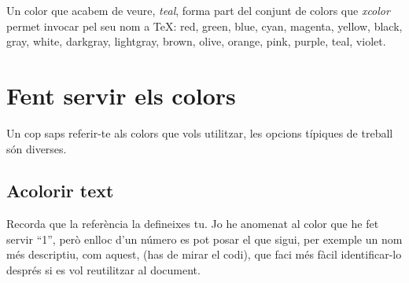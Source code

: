\documentclass[a4paper,12pt]{article}
\begin{document}
Un color que acabem de veure, \emph{teal}, forma part del conjunt de colors que \emph{xcolor} permet invocar pel seu nom a TeX:  red,  green,
 blue,
 cyan,
 magenta,
 yellow,
 black,
 gray,
 white,
 darkgray,
 lightgray,
 brown,
 olive,
 orange,
 pink,
 purple,
 teal,
 violet.

\section{Fent servir els colors}
\label{sec:us}
Un cop saps referir-te als colors que vols utilitzar, les opcions típiques de treball són diverses.

\subsection{Acolorir text} \textcolor{1}{Recorda que la referència la defineixes tu.} Jo he anomenat al color que he fet servir ``1'', però enlloc d'un número es pot posar el que sigui, per exemple un nom més descriptiu, \textcolor{caribbeangreen}{com aquest, (has de mirar el codi)}, que faci més fàcil identificar-lo després si es vol reutilitzar al document.
\end{document}
